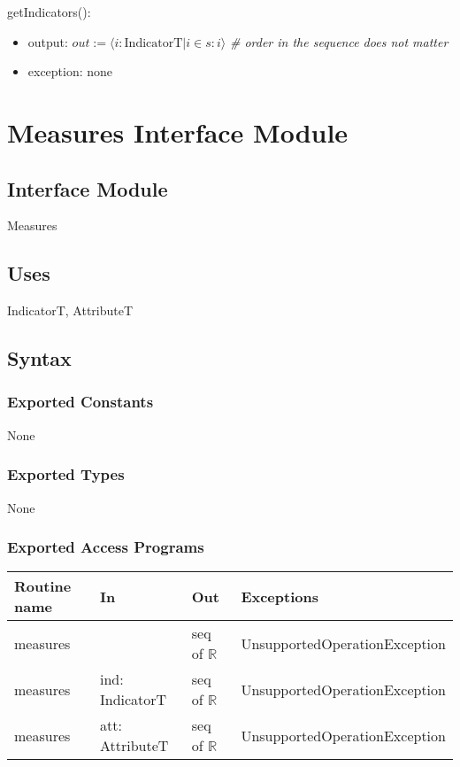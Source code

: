 \documentclass[12pt]{article}
\begin{document}
\noindent getIndicators():
\begin{itemize}
\item output: $out := \langle i: \text{IndicatorT} | i \in s : i \rangle$
  \textit{\# order in the sequence does not matter}
\item exception: none
\end{itemize}

\newpage

\section* {Measures Interface Module}

\subsection*{Interface Module}

Measures

\subsection* {Uses}

IndicatorT, AttributeT

\subsection* {Syntax}

\subsubsection* {Exported Constants}

None

\subsubsection* {Exported Types}

None 

\subsubsection* {Exported Access Programs}

\begin{tabular}{| l | l | l | p{6cm} |}
\hline
\textbf{Routine name} & \textbf{In} & \textbf{Out} & \textbf{Exceptions}\\
\hline
measures & & seq of $\mathbb{R}$ & UnsupportedOperationException\\
\hline
measures & ind: IndicatorT & seq of $\mathbb{R}$ & UnsupportedOperationException\\
\hline
measures & att: AttributeT & seq of $\mathbb{R}$ & UnsupportedOperationException\\
\hline
  
\end{tabular}
    
\end{document}
